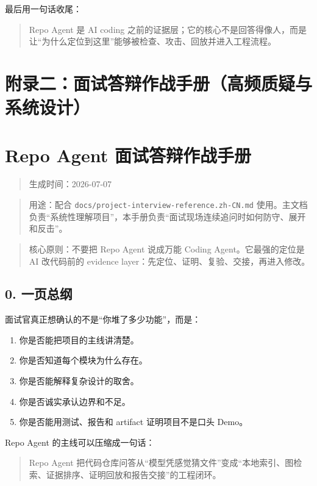 \documentclass[UTF8,12pt,openany]{ctexbook}
\begin{document}
最后用一句话收尾：\par

\begin{quote}
Repo Agent 是 AI coding 之前的证据层；它的核心不是回答得像人，而是让“为什么定位到这里”能够被检查、攻击、回放并进入工程流程。
\end{quote}


\clearpage
\chapter{附录二：面试答辩作战手册（高频质疑与系统设计）}

\clearpage
\chapter{Repo Agent 面试答辩作战手册}

\begin{quote}
生成时间：2026-07-07
\end{quote}
\begin{quote}
用途：配合 \texttt{docs/project-interview-reference.zh-CN.md} 使用。主文档负责“系统性理解项目”，本手册负责“面试现场连续追问时如何防守、展开和反击”。
\end{quote}
\begin{quote}
核心原则：不要把 Repo Agent 说成万能 Coding Agent。它最强的定位是 AI 改代码前的 evidence layer：先定位、证明、复验、交接，再进入修改。
\end{quote}

\section{0. 一页总纲}

面试官真正想确认的不是“你堆了多少功能”，而是：\par

\begin{enumerate}
\item 你是否能把项目的主线讲清楚。
\item 你是否知道每个模块为什么存在。
\item 你是否能解释复杂设计的取舍。
\item 你是否诚实承认边界和不足。
\item 你是否能用测试、报告和 artifact 证明项目不是口头 Demo。
\end{enumerate}

Repo Agent 的主线可以压缩成一句话：\par

\begin{quote}
Repo Agent 把代码仓库问答从“模型凭感觉猜文件”变成“本地索引、图检索、证据排序、证明回放和报告交接”的工程闭环。
\end{quote}
\end{document}
